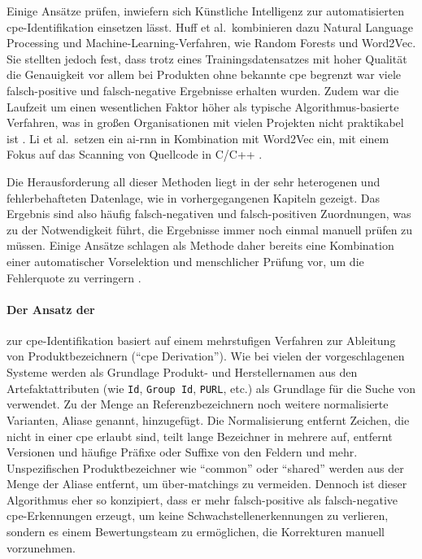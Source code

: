Einige Ansätze prüfen, inwiefern sich Künstliche Intelligenz zur automatisierten \acrshort{cpe}-Identifikation einsetzen lässt.
Huff et al.\ kombinieren dazu Natural Language Processing und Machine-Learning-Verfahren, wie Random Forests und Word2Vec.
Sie stellten jedoch fest, dass trotz eines Trainingsdatensatzes mit hoher Qualität die Genauigkeit vor allem bei Produkten ohne bekannte \acrshort{cpe} begrenzt war viele falsch-positive und falsch-negative Ergebnisse erhalten wurden.
Zudem war die Laufzeit um einen wesentlichen Faktor höher als typische Algorithmus-basierte Verfahren, was in großen Organisationen mit vielen Projekten nicht praktikabel ist \autocite{Huff2021Recommender}.
Li et al.\ setzen ein \acrfull{ai-rnn} in Kombination mit Word2Vec ein, mit einem Fokus auf das Scanning von Quellcode in C/C++ \autocite{8846081}.

\medskip

Die Herausforderung all dieser Methoden liegt in der sehr heterogenen und fehlerbehafteten Datenlage, wie in vorhergegangenen Kapiteln gezeigt.
Das Ergebnis sind also häufig falsch-negativen und falsch-positiven Zuordnungen, was zu der Notwendigkeit führt, die Ergebnisse immer noch einmal manuell prüfen zu müssen.
Einige Ansätze schlagen als Methode daher bereits eine Kombination einer automatischer Vorselektion und menschlicher Prüfung vor, um die Fehlerquote zu verringern \autocite{Takahashi_Miyamoto_Nakao_2016, Sanguino_Uetz_2017}.

\paragraph{Der Ansatz der \metaeffekt}
zur \acrshort{cpe}-Identifikation basiert auf einem mehrstufigen Verfahren zur Ableitung von Produktbezeichnern (\enquote{\acrshort{cpe} Derivation}).
Wie bei vielen der vorgeschlagenen Systeme werden als Grundlage Produkt- und Herstellernamen aus den Artefaktattributen (wie \texttt{Id}, \texttt{Group Id}, \texttt{PURL}, etc.) als Grundlage für die Suche von  verwendet.
Zu der Menge an Referenzbezeichnern noch weitere normalisierte Varianten, Aliase genannt, hinzugefügt.
Die Normalisierung entfernt Zeichen, die nicht in einer \acrshort{cpe} erlaubt sind, teilt lange Bezeichner in mehrere auf, entfernt Versionen und häufige Präfixe oder Suffixe von den Feldern und mehr.
Unspezifischen Produktbezeichner wie \enquote{common} oder \enquote{shared} werden aus der Menge der Aliase entfernt, um über-matchings zu vermeiden.
Dennoch ist dieser Algorithmus eher so konzipiert, dass er mehr falsch-positive als falsch-negative \acrshort{cpe}-Erkennungen erzeugt, um keine Schwachstellenerkennungen zu verlieren, sondern es einem Bewertungsteam zu ermöglichen, die Korrekturen manuell vorzunehmen.

